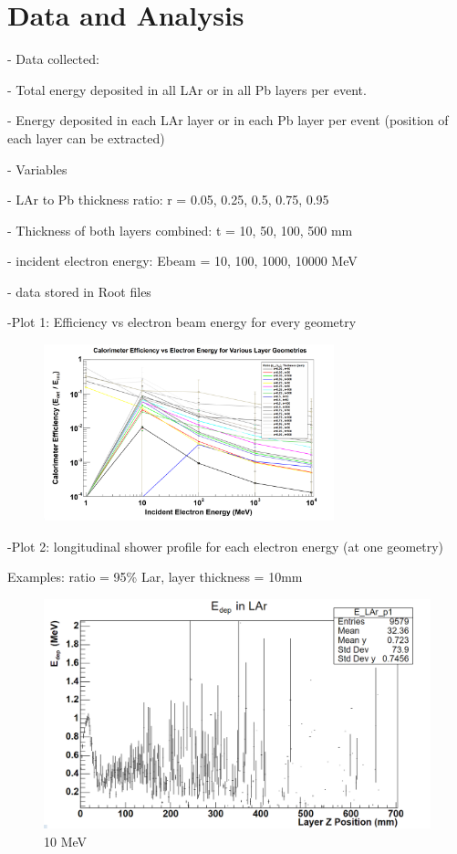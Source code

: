 \documentclass[%
 reprint,
 amsmath,amssymb,
 aps,
]{revtex4-2}
\begin{document}
\section{Data and Analysis}

- Data collected: 

    - Total energy deposited in all LAr or in all Pb layers per event.

    - Energy deposited in each LAr layer or in each Pb layer per event (position of each layer can be extracted)

- Variables

    - LAr to Pb thickness ratio: r = 0.05, 0.25, 0.5, 0.75, 0.95

    - Thickness of both layers combined: t = 10, 50, 100, 500 mm 

    - incident electron energy: Ebeam = 10, 100, 1000, 10000 MeV

- data stored in Root files

-Plot 1: Efficiency vs electron beam energy for every geometry

\onecolumngrid

\begin{figure}[H]
    \centering
    \includegraphics[width=0.75\textwidth]{efficiency2.png}%
    \caption{\label{fig:epsart}  }
\end{figure}
\twocolumngrid


-Plot 2: longitudinal shower profile for each electron energy (at one geometry)

Examples: ratio = 95\% Lar, layer thickness = 10mm

\begin{figure}[H]
    \centering
    \includegraphics[width=0.9\columnwidth]{profile_0.95_10_10.png}%
    \caption{\label{fig:epsart} 10 MeV}
\end{figure}
\end{document}
